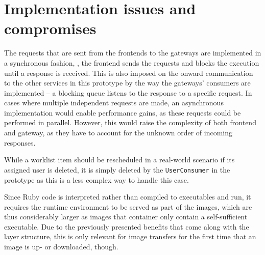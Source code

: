 \section{Implementation issues and compromises} %
  \label{sec:implementation_issues}
  The requests that are sent from the frontends to the gateways are implemented in a synchronous fashion, \ie, the frontend sends the requests and blocks the execution until a response is received. This is also imposed on the onward communication to the other services in this prototype by the way the gateways' consumers are implemented -- a blocking queue listens to the response to a specific request. In cases where multiple independent requests are made, an asynchronous implementation would enable performance gains, as these requests could be performed in parallel. However, this would raise the complexity of both frontend and gateway, as they have to account for the unknown order of incoming responses.

  While a worklist item should be rescheduled in a real-world scenario if its assigned user is deleted, it is simply deleted by the \texttt{UserConsumer} in the prototype as this is a less complex way to handle this case.

  Since Ruby code is interpreted rather than compiled to executables and run, it requires the runtime environment to be served as part of the images, which are thus considerably larger as images that container only contain a self-sufficient executable. Due to the previously presented benefits that come along with the layer structure, this is only relevant for image transfers for the first time that an image is up- or downloaded, though.

